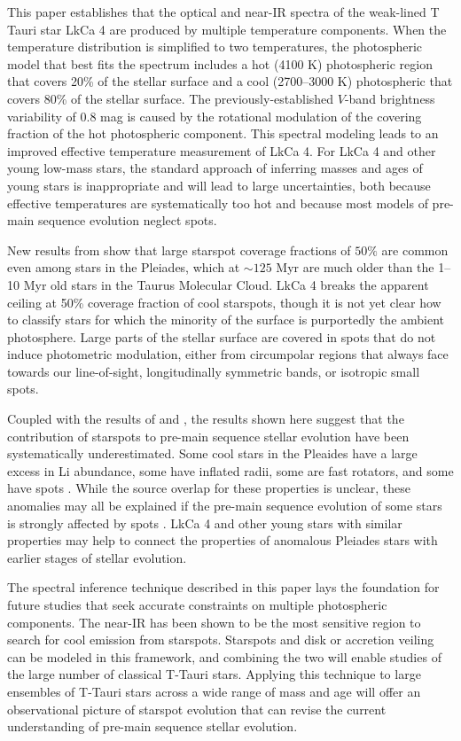 \documentclass[twocolumn]{emulateapj}%
\begin{document}
This paper establishes that the optical and near-IR spectra of the weak-lined T Tauri star LkCa 4 are produced by multiple temperature components.   When the temperature distribution is simplified to two temperatures, the photospheric model that best fits the spectrum includes a hot (4100 K) photospheric region that covers 20\% of the stellar surface and a cool (2700--3000 K) photospheric that covers 80\% of the stellar surface.  The previously-established $V$-band brightness variability of $0.8$ mag is caused by the rotational modulation of the covering fraction of the hot photospheric component.  This spectral modeling leads to an improved effective temperature measurement of LkCa 4. For LkCa 4 and other young low-mass stars, the standard approach of inferring masses and ages of young stars is inappropriate and will lead to large uncertainties, both because effective temperatures are systematically too hot and because most models of pre-main sequence evolution neglect spots.

New results from \citet{fang2016} show that large starspot coverage fractions of $50\%$ are common even among stars in the Pleiades, which at $\sim 125$ Myr are much older than the 1--10 Myr old stars in the Taurus Molecular Cloud.  LkCa 4 breaks the apparent ceiling at 50\% coverage fraction of cool starspots, though it is not yet clear how to classify stars for which the minority of the surface is purportedly the ambient photosphere.  Large parts of the stellar surface are covered in spots that do not induce photometric modulation, either from circumpolar regions that always face towards our line-of-sight, longitudinally symmetric bands, or isotropic small spots.  

Coupled with the results of \citet{fang2016} and \citet{covey16}, the results shown here suggest that the contribution of starspots to pre-main sequence stellar evolution have been systematically underestimated.  
Some cool stars in the Pleaides have a large excess in Li abundance, some have inflated radii, some are fast rotators, and some have spots \citep[e.g.][]{somers15b}.  While the source overlap for these properties is unclear, these anomalies may all be explained if the pre-main sequence evolution of some stars is strongly affected by spots \citep{somers15}.  
LkCa 4 and other young stars with similar properties may help to connect the properties of anomalous Pleiades stars with earlier stages of stellar evolution.


The spectral inference technique described in this paper lays the foundation for future studies that seek accurate constraints on multiple photospheric components.  The near-IR has been shown to be the most sensitive region to search for cool emission from starspots.  Starspots and disk or accretion veiling can be modeled in this framework, and combining the two will enable studies of the large number of classical T-Tauri stars.  Applying this technique to large ensembles of T-Tauri stars across a wide range of mass and age will offer an observational picture of starspot evolution that can revise the current understanding of pre-main sequence stellar evolution.  
\end{document}
